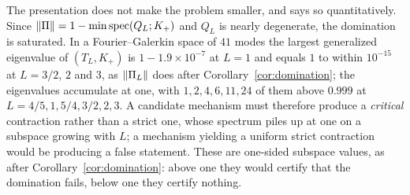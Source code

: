 The presentation does not make the problem smaller, and says so
quantitatively. Since
$\lVert \Pi\rVert=1-\min\operatorname{spec}(Q_L;K_+)$ and $Q_L$ is nearly degenerate,
the domination is saturated. In a Fourier--Galerkin space of $41$ modes the
largest generalized eigenvalue of $(T_L,K_+)$ is $1-1.9\times10^{-7}$ at $L=1$
and equals $1$ to within $10^{-15}$ at $L=3/2$, $2$ and $3$, as $\lVert \Pi_L\rVert$
does after Corollary~\ref{cor:domination}; the eigenvalues accumulate at one,
with $1,2,4,6,11,24$ of them above $0.999$ at $L=4/5,1,5/4,3/2,2,3$. A
candidate mechanism must therefore produce a \emph{critical} contraction rather
than a strict one, whose spectrum piles up at one on a subspace growing with
$L$; a mechanism yielding a uniform strict contraction would be producing a
false statement. These are one-sided subspace values, as after
Corollary~\ref{cor:domination}: above one they would certify that the
domination fails, below one they certify nothing.
